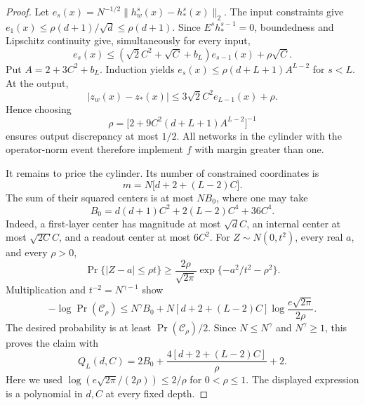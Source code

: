 \begin{proof}
Let $e_s(x)=N^{-1/2}\|h^s_w(x)-h^s_*(x)\|_2$. The input constraints give
$e_1(x)\leq\rho(d+1)/\sqrt d\leq\rho(d+1)$. Since $E^sh^{s-1}_*=0$,
boundedness and Lipschitz continuity give, simultaneously for every input,
\[
 e_s(x)\leq (\sqrt2 C^2+\sqrt C+b_L)e_{s-1}(x)+\rho\sqrt C.
\]
Put $A=2+3C^2+b_L$. Induction yields
$e_s(x)\leq\rho(d+L+1)A^{L-2}$ for $s<L$. At the output,
\[
 |z_w(x)-z_*(x)|
 \leq3\sqrt2 C^2 e_{L-1}(x)+\rho.
\]
Hence choosing
\[
 \rho=\bigl[2+9C^2(d+L+1)A^{L-2}\bigr]^{-1}
\]
ensures output discrepancy at most $1/2$. All networks in the cylinder with
the operator-norm event therefore implement $f$ with margin greater than one.

It remains to price the cylinder. Its number of constrained coordinates is
\[
 m=N\bigl[d+2+(L-2)C\bigr].
\]
The sum of their squared centers is at most $NB_0$, where one may take
\[
 B_0=d(d+1)C^2+2(L-2)C^4+36C^4.
\]
Indeed, a first-layer center has magnitude at most $\sqrt d C$, an internal
center at most $\sqrt{2C}C$, and a readout center at most $6C^2$.
For $Z\sim N(0,t^2)$, every real $a$, and every $\rho>0$,
\[
 \Pr\{|Z-a|\leq\rho t\}
 \geq\frac{2\rho}{\sqrt{2\pi}}
       \exp\{-a^2/t^2-\rho^2\}.
\]
Multiplication and $t^{-2}=N^{\gamma-1}$ show
\[
 -\log\Pr(\mathcal C_\rho)
 \leq N^\gamma B_0
 +N[d+2+(L-2)C]\log\frac{e\sqrt{2\pi}}{2\rho}.
\]
The desired probability is at least $\Pr(\mathcal C_\rho)/2$. Since
$N\leq N^\gamma$ and $N^\gamma\geq1$, this proves the claim with
\[
 Q_L(d,C)=2B_0+\frac{4[d+2+(L-2)C]}{\rho}+2.
\]
Here we used $\log(e\sqrt{2\pi}/(2\rho))\leq2/\rho$ for $0<\rho\leq1$.
The displayed expression is a polynomial in $d,C$ at every fixed depth.
\end{proof}

